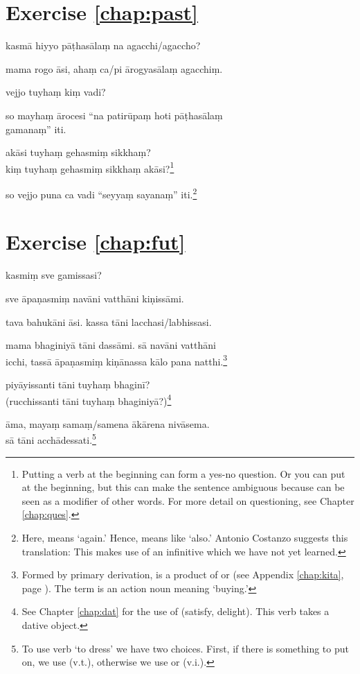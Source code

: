 \section*{Exercise \ref{chap:past}}
\begin{answerkey}
\item kasm\=a hiyyo p\=a\d thas\=ala\d m na agacchi/agaccho?
\item mama rogo \=asi, aha\d m ca/pi \=arogyas\=ala\d m agacchi\d m.
\item vejjo tuyha\d m ki\d m vadi?
\item so mayha\d m \=arocesi ``na patir\=upa\d m hoti p\=a\d thas\=ala\d m \\gamana\d m'' iti.
\item ak\=asi tuyha\d m gehasmi\d m sikkha\d m? \\ki\d m tuyha\d m gehasmi\d m sikkha\d m ak\=asi?\footnote{Putting a verb at the beginning can form a yes-no question. Or you can put  at the beginning, but this can make the sentence ambiguous because  can be seen as a modifier of other words. For more detail on questioning, see Chapter \ref{chap:ques}.}
\item so vejjo puna ca vadi ``seyya\d m sayana\d m'' iti.\footnote{Here,  means `again.' Hence,  means like `also.' Antonio Costanzo suggests this translation:  This makes use of an infinitive which we have not yet learned.}
\end{answerkey}

\section*{Exercise \ref{chap:fut}}
\begin{answerkey}
\item kasmi\d m sve gamissasi?
\item sve \=apa\d nasmi\d m nav\=ani vatth\=ani ki\d niss\=ami.
\item tava bahuk\=ani \=asi. kassa t\=ani lacchasi/labhissasi.
\item mama bhaginiy\=a t\=ani dass\=ami. s\=a nav\=ani vatth\=ani \\icchi, tass\=a \=apa\d nasmi\d m ki\d n\=anassa k\=alo pana natthi.\footnote{Formed by primary derivation,  is a product of  or  (see Appendix \ref{chap:kita}, page \pageref{pacck4:yu}). The term is an action noun meaning `buying.'}
\item piy\=ayissanti t\=ani tuyha\d m bhagin\=i? \\(rucchissanti t\=ani tuyha\d m bhaginiy\=a?)\footnote{See Chapter \ref{chap:dat} for the use of  (satisfy, delight). This verb takes a dative object.}
\item \=ama, maya\d m sama\d m/samena \=ak\=arena niv\=asema. \\s\=a t\=ani acch\=adessati.\footnote{To use verb `to dress' we have two choices. First, if there is something to put on, we use  (v.t.), otherwise we use  or  (v.i.).}
\end{answerkey}

